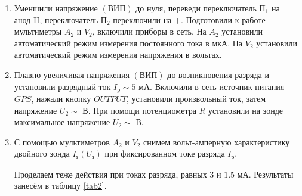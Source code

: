 \documentclass[a4paper,12pt]{article} %
\begin{document}
\begin{enumerate}
    \item Уменшили напряжение $(\text{ВИП})$ до нуля, переведи переключатель $\text{П}_1$ на анод-II, переключатель $\text{П}_2$ переключили на $+$.
    Подготовили к работе мультиметры $A_2$ и $V_2$, включили приборы в сеть.
    На $A_2$ установили автоматический режим измерения постоянного тока в мкА. На $V_2$ установили автоматический режим измерения напряжения в вольтах.
    \item Плавно увеличивая напряжения $(\text{ВИП})$ до возникновения разряда и установили разрядный ток $I_{\text{р}} \sim 5 \text{ мА}$.
    Включили в сеть источник питания $GPS$, нажали кнопку $OUTPUT$, установили произвольный ток, затем напряжение $U_2 \sim \text{ В}$.
    При помощи потенциометра $R$ установили на зонде максимальное напряжение $U_2 \sim \text{ В}$.
    \item С помощью мультиметров $A_2$ и $V_2$ снимем вольт-амперную характеристику двойного зонда $I_{\text{з}}(U_{\text{з}})$ при фиксированном токе разряда $I_{\text{р}}$.

    Проделаем теже действия при токах разряда, равных $3$ и $1.5 \text{ мА}$. Результаты занесём в таблицу \ref{tab2}.


\end{enumerate}
\end{document}
